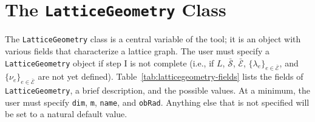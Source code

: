 \documentclass[11pt, oneside]{article}   	%
\theoremstyle{definition}
\newcommand\sS{\mathcal{S}}
\newcommand\sE{\mathcal{E}}
\newcommand\oS{\bar{\sS}}
\newcommand\oE{\bar{\sE}}
\begin{document}
\section{The \texttt{LatticeGeometry} Class}
The \texttt{LatticeGeometry} class is a central variable of the tool; it is an object with various fields that characterize a lattice graph. The user must specify a \texttt{LatticeGeometry} object if step I is not complete (i.e., if $L$, $\oS$, $\oE$, $\{\lambda_e\}_{e \in \oE}$, and $\{\nu_e\}_{e \in \oE}$ are not yet defined). Table~\ref{tab:latticegeometry-fields} lists the fields of \texttt{LatticeGeometry}, a brief description, and the possible values. At a minimum, the user must specify \texttt{dim}, \texttt{m}, \texttt{name}, and \texttt{obRad}. Anything else that is not specified will be set to a natural default value.
\end{document}
